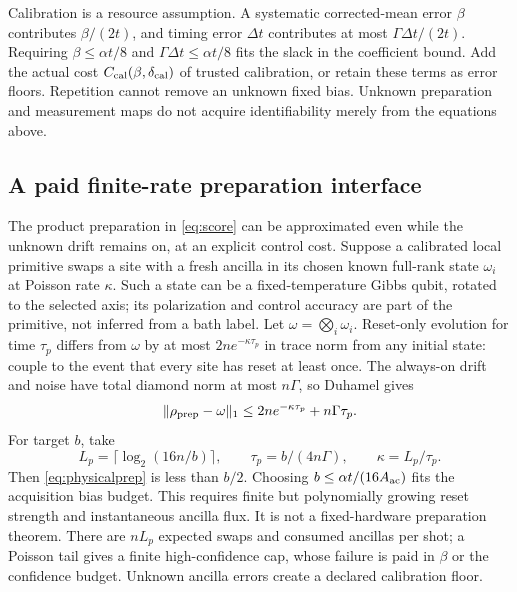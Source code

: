 \documentclass[11pt,reqno]{amsart}
\numberwithin{equation}{section}
\theoremstyle{definition}
\theoremstyle{remark}
\newcommand{\nn}[1]{\lVert#1\rVert}
\begin{document}
Calibration is a resource assumption. A systematic corrected-mean error $\beta$ contributes $\beta/(2t)$, and timing error $\Delta t$ contributes at most $\Gamma\Delta t/(2t)$. Requiring $\beta\leq\alpha t/8$ and $\Gamma\Delta t\leq\alpha t/8$ fits the slack in the coefficient bound. Add the actual cost $C_{\rm cal}(\beta,\delta_{\rm cal})$ of trusted calibration, or retain these terms as error floors. Repetition cannot remove an unknown fixed bias. Unknown preparation and measurement maps do not acquire identifiability merely from the equations above.

\subsection{A paid finite-rate preparation interface}
The product preparation in \eqref{eq:score} can be approximated even while the unknown drift remains on, at an explicit control cost. Suppose a calibrated local primitive swaps a site with a fresh ancilla in its chosen known full-rank state $\omega_i$ at Poisson rate $\kappa$. Such a state can be a fixed-temperature Gibbs qubit, rotated to the selected axis; its polarization and control accuracy are part of the primitive, not inferred from a bath label. Let $\omega=\bigotimes_i\omega_i$. Reset-only evolution for time $\tau_p$ differs from $\omega$ by at most $2ne^{-\kappa\tau_p}$ in trace norm from any initial state: couple to the event that every site has reset at least once. The always-on drift and noise have total diamond norm at most $n\Gamma$, so Duhamel gives
\begin{equation}\label{eq:physicalprep}
 \nn{\rho_{\rm prep}-\omega}_1
 \leq2ne^{-\kappa\tau_p}+n\Gamma\tau_p.
\end{equation}
For target $b$, take
\[
 L_p=\lceil\log_2(16n/b)\rceil,\qquad
 \tau_p=b/(4n\Gamma),\qquad \kappa=L_p/\tau_p.
\]
Then \eqref{eq:physicalprep} is less than $b/2$. Choosing $b\leq\alpha t/(16A_{\rm ac})$ fits the acquisition bias budget. This requires finite but polynomially growing reset strength and instantaneous ancilla flux. It is not a fixed-hardware preparation theorem. There are $nL_p$ expected swaps and consumed ancillas per shot; a Poisson tail gives a finite high-confidence cap, whose failure is paid in $\beta$ or the confidence budget. Unknown ancilla errors create a declared calibration floor.
\end{document}
